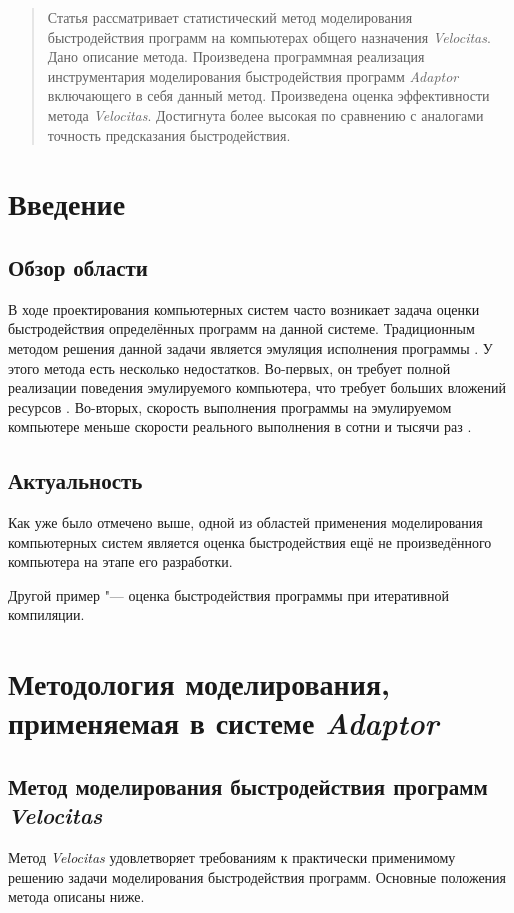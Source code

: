\documentclass{disser}
\begin{document}
\begin{abstract}
Статья рассматривает статистический метод моделирования быстродействия программ на компьютерах общего назначения \textit{Velocitas}. Дано описание метода. Произведена программная реализация инструментария моделирования быстродействия программ \textit{Adaptor} включающего в себя данный метод. Произведена оценка эффективности метода \textit{Velocitas}. Достигнута более высокая по сравнению с аналогами точность предсказания быстродействия.
\end{abstract}

\section*{Введение}
\subsection*{Обзор области}
В ходе проектирования компьютерных систем часто возникает задача оценки быстродействия определённых программ на данной системе. Традиционным методом решения данной задачи является эмуляция исполнения программы \cite{emulation}. У этого метода есть несколько недостатков. Во-первых, он требует полной реализации поведения эмулируемого компьютера, что требует больших вложений ресурсов \cite{emulation-complexity}. Во-вторых, скорость выполнения программы на эмулируемом компьютере меньше скорости реального выполнения в сотни и тысячи раз \cite{emulation-speed}.
\subsection*{Актуальность}
Как уже было отмечено выше, одной из областей применения моделирования компьютерных систем является оценка быстродействия ещё не произведённого компьютера на этапе его разработки.

Другой пример "--- оценка быстродействия программы при итеративной компиляции.
\section{Методология моделирования, применяемая в системе \textit{Adaptor}}
\subsection{Метод моделирования быстродействия программ \textit{Velocitas}}

Метод \textit{Velocitas} удовлетворяет требованиям к практически применимому решению задачи моделирования быстродействия программ. Основные положения метода описаны ниже.
\end{document}
